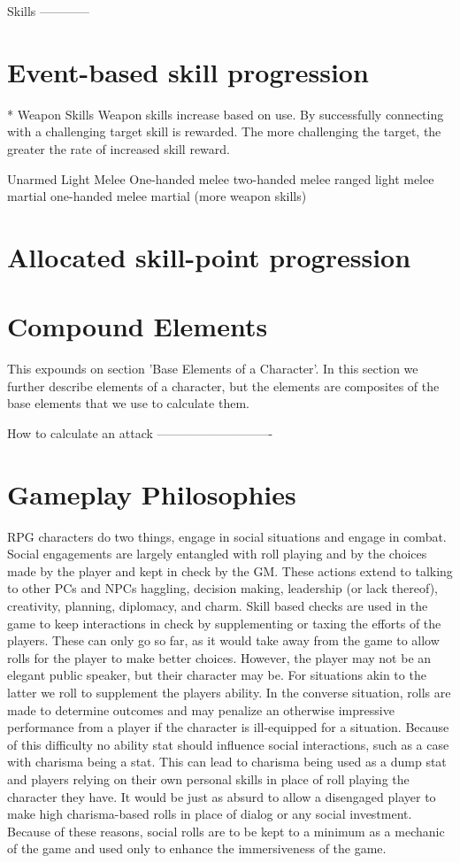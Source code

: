 \documentclass{article}
\begin{document}
Skills
------------
\section{Event-based skill progression}
* Weapon Skills
Weapon skills increase based on use.
By successfully connecting with a challenging target skill is rewarded.
The more challenging the target, the greater the rate of increased skill reward.

Unarmed
Light Melee
One-handed melee
two-handed melee
ranged
light melee martial
one-handed melee martial
(more weapon skills)


\section{Allocated skill-point progression}



\section{Compound Elements}
This expounds on section 'Base Elements of a Character'.
In this section we further describe elements of a character, but the elements are composites of the base elements that we use to calculate them. 

How to calculate an attack
----------------------------






 
\section{Gameplay Philosophies}
RPG characters do two things, engage in social situations and engage in combat. Social engagements are largely entangled with roll playing and by the choices made by the player and kept in check by the GM. These actions extend to talking to other PCs and NPCs haggling, decision making, leadership (or lack thereof), creativity, planning, diplomacy, and charm. Skill based checks are used in the game to keep interactions in check by supplementing or taxing the efforts of the players. These can only go so far, as it would take away from the game to allow rolls for the player to make better choices. However, the player may not be an elegant public speaker, but their character may be. For situations akin to the latter we roll to supplement the players ability. In the converse situation, rolls are made to determine outcomes and may penalize an otherwise impressive performance from a player if the character is ill-equipped for a situation. Because of this difficulty no ability stat should influence social interactions, such as a case with charisma being a stat. This can lead to charisma being used as a dump stat and players relying on their own personal skills in place of roll playing the character they have. It would be just as absurd to allow a disengaged player to make high charisma-based rolls in place of dialog or any social investment. Because of these reasons, social rolls are to be kept to a minimum as a mechanic of the game and used only to enhance the immersiveness of the game.  
\end{document}
